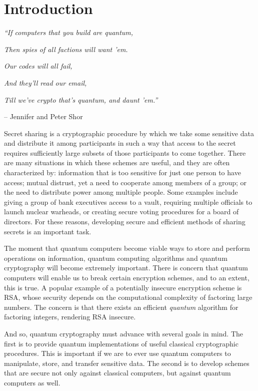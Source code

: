 \chapter{Introduction}
\label{introduction}


\textit{``If computers that you build are quantum,}

\textit{Then spies of all factions will want 'em.}

\textit{Our codes will all fail,}

\textit{And they'll read our email,}

\textit{Till we've crypto that's quantum, and daunt 'em.''}

 \quad -- Jennifer and Peter Shor


Secret sharing is a cryptographic procedure by which we take some sensitive data and distribute it among participants in such a way that access to the secret requires sufficiently large subsets of those participants to come together. There are many situations in which these schemes are useful, and they are often characterized by: information that is too sensitive for just one person to have access; mutual distrust, yet a need to cooperate among members of a group; or the need to distribute power among multiple people. Some examples include giving a group of bank executives access to a vault, requiring multiple officials to launch nuclear warheads, or creating secure voting procedures for a board of directors. For these reasons, developing secure and efficient methods of sharing secrets is an important task. 

The moment that quantum computers become viable ways to store and perform operations on information, quantum computing algorithms and quantum cryptography will become extremely important. There is concern that quantum computers will enable us to break certain encryption schemes, and to an extent, this is true. A popular example of a potentially insecure encryption scheme is RSA, whose security depends on the computational complexity of factoring large numbers. The concern is that there exists an efficient \textit{quantum} algorithm for factoring integers, rendering RSA insecure.

And so, quantum cryptography must advance with several goals in mind. The first is to provide quantum implementations of useful classical cryptographic procedures. This is important if we are to ever use quantum computers to manipulate, store, and transfer sensitive data. The second is to develop schemes that are secure not only against classical computers, but against quantum computers as well.

